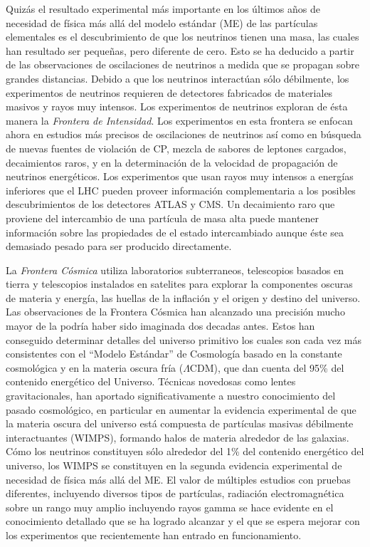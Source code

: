 Quizás el resultado experimental más importante en los últimos años de
necesidad de física más allá del modelo estándar (ME) de las
partículas elementales es el descubrimiento de que los neutrinos
tienen una masa, las cuales han resultado ser pequeñas, pero diferente
de cero. Esto se ha deducido a partir de las observaciones de
oscilaciones de neutrinos a medida que se propagan sobre grandes
distancias. Debido a que los neutrinos interactúan sólo débilmente,
los experimentos de neutrinos requieren de detectores fabricados de
materiales masivos y rayos muy intensos. Los experimentos de neutrinos
exploran de ésta manera la \emph{Frontera de Intensidad}. Los experimentos en
esta frontera se enfocan ahora en estudios más precisos de
oscilaciones de neutrinos así como en búsqueda de nuevas fuentes de
violación de CP, mezcla de sabores de leptones cargados, decaimientos
raros, y en la determinación de la velocidad de propagación de
neutrinos energéticos. Los experimentos que usan rayos muy intensos a
energías inferiores que el LHC pueden proveer información
complementaria a los posibles descubrimientos de los detectores ATLAS
y CMS. Un decaimiento raro que proviene del intercambio de una
partícula de masa alta puede mantener información sobre las
propiedades de el estado intercambiado aunque éste sea demasiado
pesado para ser producido directamente.

La \emph{Frontera Cósmica} utiliza laboratorios subterraneos, telescopios
basados en tierra y telescopios instalados en satelites para explorar
la componentes oscuras de materia y energía, las huellas de la
inflación y el origen y destino del universo. Las observaciones de la
Frontera Cósmica han alcanzado una precisión mucho mayor de la podría
haber sido imaginada dos decadas antes. Estos han conseguido
determinar detalles del universo primitivo los cuales son cada vez más
consistentes con el ``Modelo Estándar'' de Cosmología basado en la
constante cosmológica y en la materia oscura fría ($\Lambda$CDM), que
dan cuenta del 95\% del contenido energético del Universo. Técnicas
novedosas como lentes gravitacionales, han aportado significativamente
a nuestro conocimiento del pasado cosmológico, en particular en
aumentar la evidencia experimental de que la materia oscura del universo
está compuesta de partículas masivas débilmente interactuantes (WIMPS),
formando halos de materia alrededor de las galaxias. Cómo los 
neutrinos constituyen sólo alrededor del 1\% del contenido energético
del universo, los WIMPS se constituyen en la segunda evidencia
experimental de necesidad de física más allá del ME.  El valor de múltiples
estudios con pruebas diferentes, incluyendo diversos tipos de
partículas, radiación electromagnética sobre un rango muy amplio
incluyendo rayos gamma se hace evidente en el conocimiento detallado
que se ha logrado alcanzar y el que se espera mejorar con los
experimentos que recientemente han entrado en funcionamiento.

